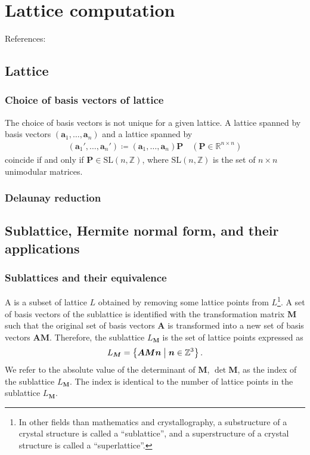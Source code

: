\section{\label{sec:lattice}Lattice computation}

References: \cite{Hart2008,Hart2009,Cohen1993,CSE206A}

\subsection{Lattice}

\subsubsection{Choice of basis vectors of lattice}

The choice of basis vectors is not unique for a given lattice.
A lattice spanned by basis vectors $( \bm{a}_{1}, \dots, \bm{a}_{n} )$ and a lattice spanned by
\begin{align*}
  ( \bm{a}_{1}', \dots, \bm{a}_{n}' ) \coloneqq ( \bm{a}_{1}, \dots, \bm{a}_{n} ) \bm{P} \quad (\bm{P} \in \mathbb{R}^{n \times n})
\end{align*}
coincide if and only if $\bm{P} \in \mathrm{SL}(n, \mathbb{Z})$, where $ \mathrm{SL}(n, \mathbb{Z})$ is the set of $n \times n$ unimodular matrices.

\subsubsection{Delaunay reduction}

\subsection{Sublattice, Hermite normal form, and their applications}

\subsubsection{Sublattices and their equivalence}

A  is a subset of lattice $L$ obtained by removing some lattice points from $L$\footnote{
  In other fields than mathematics and crystallography, a substructure of a crystal structure is called a ``sublattice'', and a superstructure of a crystal structure is called a ``superlattice''.
}.
A set of basis vectors of the sublattice is identified with the transformation matrix $\bm{M}$ such that the original set of basis vectors $\bm{A}$ is transformed into a new set of basis vectors $\bm{AM}$.
Therefore, the sublattice $L_{\bm{M}}$ is the set of lattice points expressed as
\begin{align}
  L_{\bm{M}} = \left\{  \bm{AMn}  \mathrel{}\middle|\mathrel{}  \bm{n} \in \mathbb{Z}^{3}  \right\}.
\end{align}
We refer to the absolute value of the determinant of $\bm{M}$, $\det \bm{M}$, as the index of the sublattice $L_{\bm{M}}$.
The index is identical to the number of lattice points in the sublattice $L_{\bm{M}}$.

